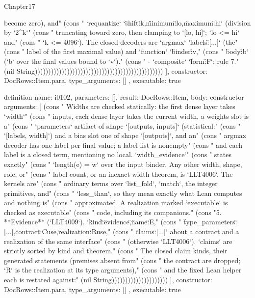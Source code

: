 \begin{lexlean}{Chapter17}
\begin{semanticmodule}
{{become zero), and" (cons "     `requantize` `{\"shift\":k,\"minimum\":lo,\"maximum\":hi}` (division by `2^k`" (cons "     truncating toward zero, then clamping to `[lo, hi]`; `lo <= hi` and" (cons "     `k <= 4096`). The closed decoders are `argmax` `{\"labels\":[...]}` (the" (cons "     label of the first maximal value) and `function` `{\"binder\":v," (cons "     \"body\":b}` (`b` over the final values bound to `v`)." (cons "   - `composite` `{\"form\":F}`: rule 7." (nil String))))))))))))))))))))))))))))))))))))))))))))))))
    ],
    constructor: DocRows::Item.para,
    type_arguments: []
  },
  executable: true
}

definition{
  name: i0102,
  parameters: [],
  result: DocRows::Item,
  body: constructor{
    arguments: [
      (cons "   Widths are checked statically: the first dense layer takes `width`" (cons "   inputs, each dense layer takes the current width, a weights slot is a" (cons "   `parameters` artifact of shape `[outputs, inputs]` (statistical:" (cons "   `[labels, width]`) and a bias slot one of shape `[outputs]`, and an" (cons "   argmax decoder has one label per final value; a label list is nonempty" (cons "   and each label is a closed term, mentioning no local. `width_evidence`" (cons "   states exactly" (cons "   `length(e) = w` over the input binder. Any other width, shape, role, or" (cons "   label count, or an inexact width theorem, is `LLT4006`. The kernels are" (cons "   ordinary terms over `list_fold`, `match`, the integer primitives, and" (cons "   `less_than`, so they mean exactly what Lean computes and nothing is" (cons "   approximated. A realization marked `executable` is checked as executable" (cons "   code, including its companions." (cons "5. **Evidence** (`LLT4009`). `{\"kind\":\"evidence\",\"name\":E," (cons "   \"type_parameters\":[...],\"contract\":Cuse,\"realization\":Ruse," (cons "   \"claims\":[...]}` about a contract and a realization of the same interface" (cons "   (otherwise `LLT4006`). `claims` are strictly sorted by kind and theorem." (cons "   The closed claim kinds, their generated statements (premises absent from" (cons "   the contract are dropped; `R` is the realization at its type arguments)," (cons "   and the fixed Lean helper each is restated against:" (nil String)))))))))))))))))))))
    ],
    constructor: DocRows::Item.para,
    type_arguments: []
  },
  executable: true
}


\end{semanticmodule}
\end{lexlean}
